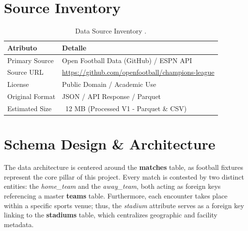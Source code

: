 \documentclass[12pt,a4paper]{article}
\begin{document}
\section{Source Inventory}
\begin{table}[h!]
    \centering
    \begin{tabular}{ll}
        \toprule
        \textbf{Atributo} & \textbf{Detalle} \\
        \midrule
        Primary Source& Open Football Data (GitHub) / ESPN API\\
        Source URL& \url{https://github.com/openfootball/champions-league}\\
        License& Public Domain / Academic Use\\
        Original Format& JSON / API Response / Parquet\\
        Estimated Size& ~12 MB (Processed V1 - Parquet \& CSV)\\
        \bottomrule
    \end{tabular}
    \caption{Data Source Inventory .}
\end{table}

\section{Schema Design \& Architecture}
The data architecture is centered around the \textbf{matches} table, as football fixtures represent the core pillar of this project. Every match is contested by two distinct entities: the \textit{home\_team} and the \textit{away\_team}, both acting as foreign keys referencing a master \textbf{teams} table. Furthermore, each encounter takes place within a specific sports venue; thus, the \textit{stadium} attribute serves as a foreign key linking to the \textbf{stadiums} table, which centralizes geographic and facility metadata.
\end{document}
